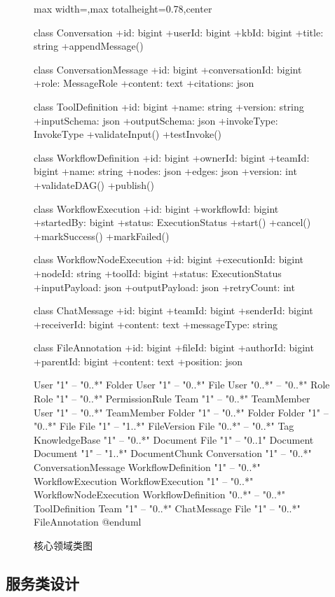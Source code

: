 \documentclass[a4paper,zihao=-4]{ctexart}
\begin{document}
\begin{figure}[H]
\begin{adjustbox}{max width=\linewidth,max totalheight=0.78\textheight,center}
\begin{plantuml}
class Conversation {
  +id: bigint
  +userId: bigint
  +kbId: bigint
  +title: string
  +appendMessage()
}

class ConversationMessage {
  +id: bigint
  +conversationId: bigint
  +role: MessageRole
  +content: text
  +citations: json
}

class ToolDefinition {
  +id: bigint
  +name: string
  +version: string
  +inputSchema: json
  +outputSchema: json
  +invokeType: InvokeType
  +validateInput()
  +testInvoke()
}

class WorkflowDefinition {
  +id: bigint
  +ownerId: bigint
  +teamId: bigint
  +name: string
  +nodes: json
  +edges: json
  +version: int
  +validateDAG()
  +publish()
}

class WorkflowExecution {
  +id: bigint
  +workflowId: bigint
  +startedBy: bigint
  +status: ExecutionStatus
  +start()
  +cancel()
  +markSuccess()
  +markFailed()
}

class WorkflowNodeExecution {
  +id: bigint
  +executionId: bigint
  +nodeId: string
  +toolId: bigint
  +status: ExecutionStatus
  +inputPayload: json
  +outputPayload: json
  +retryCount: int
}

class ChatMessage {
  +id: bigint
  +teamId: bigint
  +senderId: bigint
  +receiverId: bigint
  +content: text
  +messageType: string
}

class FileAnnotation {
  +id: bigint
  +fileId: bigint
  +authorId: bigint
  +parentId: bigint
  +content: text
  +position: json
}

User "1" -- "0..*" Folder
User "1" -- "0..*" File
User "0..*" -- "0..*" Role
Role "1" -- "0..*" PermissionRule
Team "1" -- "0..*" TeamMember
User "1" -- "0..*" TeamMember
Folder "1" -- "0..*" Folder
Folder "1" -- "0..*" File
File "1" -- "1..*" FileVersion
File "0..*" -- "0..*" Tag
KnowledgeBase "1" -- "0..*" Document
File "1" -- "0..1" Document
Document "1" -- "1..*" DocumentChunk
Conversation "1" -- "0..*" ConversationMessage
WorkflowDefinition "1" -- "0..*" WorkflowExecution
WorkflowExecution "1" -- "0..*" WorkflowNodeExecution
WorkflowDefinition "0..*" -- "0..*" ToolDefinition
Team "1" -- "0..*" ChatMessage
File "1" -- "0..*" FileAnnotation
@enduml
\end{plantuml}
\endgroup
\end{adjustbox}
\caption{核心领域类图}
\end{figure}

\hypertarget{ux670dux52a1ux7c7bux8bbeux8ba1}{%
\subsection{服务类设计}\label{ux670dux52a1ux7c7bux8bbeux8ba1}}
\end{document}
